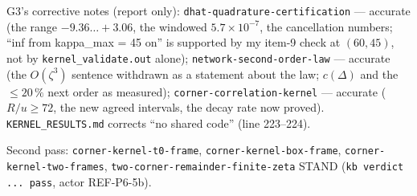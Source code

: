 \documentclass[11pt]{article}
\begin{document}
G3's corrective notes (report only): \texttt{dhat-quadrature-certification} --- accurate (the range $-9.36\ldots+3.06$, the windowed
$5.7\times10^{-7}$, the cancellation numbers; ``inf from kappa\_max = 45 on'' is supported by my item-9 check at $(60,45)$, not by
\texttt{kernel\_validate.out} alone); \texttt{network-second-order-law} --- accurate (the $O(\zeta^3)$ sentence withdrawn as a statement about
the law; $c(\Delta)$ and the $\le20\,\%$ next order as measured); \texttt{corner-correlation-kernel} --- accurate ($R/u\ge72$, the
new agreed intervals, the decay rate now proved). \texttt{KERNEL\_RESULTS.md} corrects ``no shared code'' (line 223--224).
\begin{verdictok}
Second pass: \texttt{corner-kernel-t0-frame}, \texttt{corner-kernel-box-frame}, \texttt{corner-kernel-two-frames},
\texttt{two-corner-remainder-finite-zeta} STAND (\texttt{kb verdict ... pass}, actor REF-P6-5b).
\end{verdictok}
\end{document}
